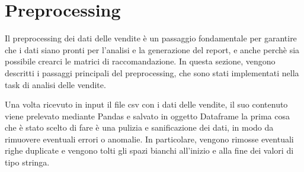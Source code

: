 \section{Preprocessing}
\label{sec:preprocessing}

Il preprocessing dei dati delle vendite è un passaggio fondamentale per garantire che i dati siano pronti per l'analisi e la generazione del report, e anche perchè sia possibile crearci le matrici di raccomandazione.
In questa sezione, vengono descritti i passaggi principali del preprocessing, che sono stati implementati nella task di analisi delle vendite.

Una volta ricevuto in input il file csv con i dati delle vendite, il suo contenuto viene prelevato mediante Pandas e salvato in oggetto Dataframe la prima cosa che è stato scelto di fare è una pulizia e sanificazione dei dati, in modo da rimuovere eventuali errori o anomalie. In particolare, vengono rimosse eventuali righe duplicate e vengono tolti gli spazi bianchi all'inizio e alla fine dei valori di tipo stringa.


